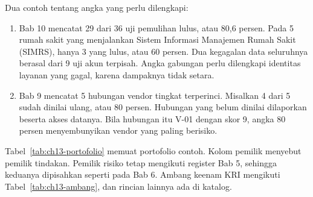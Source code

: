 Dua contoh tentang angka yang perlu dilengkapi:
\begin{enumerate}
  \item Bab 10 mencatat 29 dari 36 uji pemulihan lulus, atau 80,6 persen. Pada 5 rumah sakit yang
  menjalankan Sistem Informasi Manajemen Rumah Sakit (SIMRS), hanya 3 yang lulus, atau 60 persen.
  Dua kegagalan data seluruhnya berasal dari 9 uji akun terpisah. Angka gabungan perlu dilengkapi
  identitas layanan yang gagal, karena dampaknya tidak setara.
  \item Bab 9 mencatat 5 hubungan vendor tingkat terperinci. Misalkan 4 dari 5 sudah dinilai ulang,
  atau 80 persen. Hubungan yang belum dinilai dilaporkan beserta akses datanya. Bila hubungan itu
  V-01 dengan skor 9, angka 80 persen menyembunyikan vendor yang paling berisiko.
\end{enumerate}

Tabel~\ref{tab:ch13-portofolio} memuat portofolio contoh. Kolom pemilik menyebut pemilik tindakan.
Pemilik risiko tetap mengikuti register Bab 5, sehingga keduanya dipisahkan seperti pada Bab 6.
Ambang keenam KRI mengikuti Tabel~\ref{tab:ch13-ambang}, dan rincian lainnya ada di katalog.

